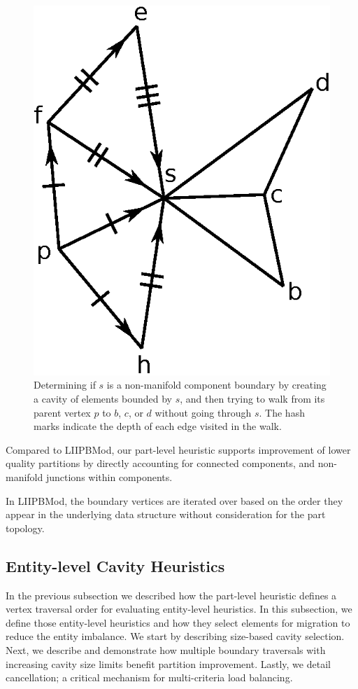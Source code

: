 \begin{figure} \centering
  \includegraphics[width=.35\textwidth]{figs/compDist/cavityPaths.eps}
  \caption[Detecting non-manifold component boundaries.]{
    Determining if $s$ is a non-manifold component boundary by creating a cavity
    of elements bounded by $s$, and then trying to walk from its parent vertex
    $p$ to $b$, $c$, or $d$ without going through $s$.
    The hash marks indicate the depth of each edge visited in the walk.
  }
  \label{fig:cavityPaths}
\end{figure}

Compared to LIIPBMod, our part-level heuristic supports improvement of lower
quality partitions by directly accounting for connected components, and
non-manifold junctions within components.

In LIIPBMod, the boundary vertices are iterated over based on the order they
appear in the underlying data structure without consideration for the part
topology.

\subsection{Entity-level Cavity Heuristics}\label{sec:entlvl}
In the previous subsection we described how the part-level heuristic defines a
vertex traversal order for evaluating entity-level heuristics.
In this subsection, we define those entity-level heuristics and how they select
elements for migration to reduce the entity imbalance.
We start by describing size-based cavity selection.
Next, we describe and demonstrate how multiple boundary traversals with
increasing cavity size limits benefit partition improvement.
Lastly, we detail cancellation; a critical mechanism for multi-criteria load
balancing.

